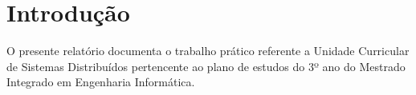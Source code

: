 \chapter{Introdução}
\label{cap:intro}

O presente relatório documenta o trabalho prático referente a Unidade Curricular de Sistemas Distribuídos pertencente ao plano de estudos do 3º ano do Mestrado Integrado em Engenharia Informática.



